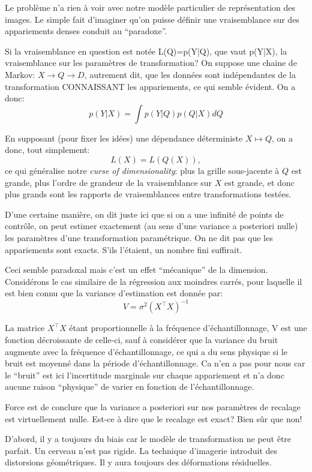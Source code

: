 \documentclass{article}
\begin{document}
Le probl\`eme n'a rien \`a voir avec notre mod\`ele particulier de repr\'esentation des images. Le simple fait d'imaginer qu'on puisse d\'efinir une vraisemblance sur des appariements denses conduit au ``paradoxe''. 

Si la vraisemblance en question est not\'ee L(Q)=p(Y|Q), que vaut p(Y|X), la vraisemblance sur les param\`etres de transformation? On suppose une chaine de Markov: $X \to Q \to D$, autrement dit, que les donn\'ees sont ind\'ependantes de la transformation CONNAISSANT les appariements, ce qui semble \'evident. On a donc: 
$$
p(Y|X) = \int p(Y|Q)p(Q|X) dQ
$$

En supposant (pour fixer les id\'ees) une d\'ependance d\'eterministe $X \mapsto Q$, on a donc, tout simplement: 
$$
L(X) = L(Q(X)),
$$
ce qui g\'en\'eralise notre {\em curse of dimensionality}: plus la grille sous-jacente \`a $Q$ est grande, plus l'ordre de grandeur de la vraisemblance sur $X$ est grande, et donc plus grands sont les rapports de vraisemblances entre transformations test\'ees.  

D'une certaine mani\`ere, on dit juste ici que si on a une infinit\'e de points de contr\^ole, on peut estimer exactement (au sens d'une variance a posteriori nulle) les param\`etres d'une transformation param\'etrique. On ne dit pas que les appariements sont exacts. S'ils l'\'etaient, un nombre fini suffirait. 

Ceci semble paradoxal mais c'est un effet ``m\'ecanique'' de la dimension. Consid\'erons le cas similaire de la r\'egression aux moindres carr\'es, pour laquelle il est bien connu que la variance d'estimation est donn\'ee par: 
$$V = \sigma^2 (X^\top X)^{-1}$$ 

La matrice $X^\top X$ \'etant proportionnelle \`a la fr\'equence d'\'echantillonnage, V est une fonction d\'ecroissante de celle-ci, sauf \`a consid\'erer que la variance du bruit augmente avec la fr\'equence d'\'echantillonnage, ce qui a du sens physique si le bruit est moyenn\'e dans la p\'eriode d'\'echantillonnage. Ca n'en a pas pour nous car le ``bruit'' est ici l'incertitude marginale sur chaque appariement et n'a donc aucune raison ``physique'' de varier en fonction de l'\'echantillonnage. 

Force est de conclure que la variance a posteriori sur nos param\`etres de recalage est virtuellement nulle. Est-ce \`a dire que le recalage est exact? Bien s\^ur que non! 

D'abord, il y a toujours du biais car le mod\`ele de transformation ne peut \^etre parfait. Un cerveau n'est pas rigide. La technique d'imagerie introduit des distorsions g\'eom\'etriques. Il y aura toujours des d\'eformations r\'esiduelles. 
\end{document}
